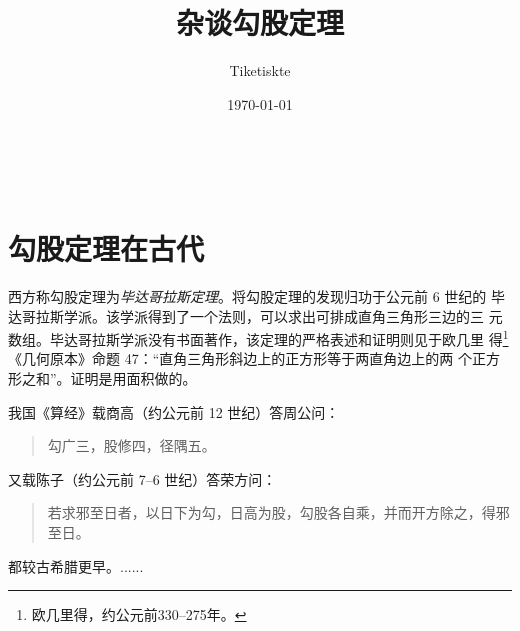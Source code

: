 \documentclass[UTF8]{ctexart} %
\title{杂谈勾股定理}
\author{Tiketiskte}
\date{\today}
\begin{document}

    \maketitle %
    \
    \tableofcontents %
    \section{勾股定理在古代} %
    西方称勾股定理为\emph{毕达哥拉斯定理}。将勾股定理的发现归功于公元前 6 世纪的
    毕达哥拉斯学派。该学派得到了一个法则，可以求出可排成直角三角形三边的三
    元数组。毕达哥拉斯学派没有书面著作，该定理的严格表述和证明则见于欧几里
    得\footnote{欧几里得，约公元前330--275年。}《几何原本》命题 47：“直角三角形斜边上的正方形等于两直角边上的两
    个正方形之和”。证明是用面积做的。

    我国《算经》载商高（约公元前 12 世纪）答周公问：
    \begin{quote}
        \kaishu
        勾广三，股修四，径隅五。
    \end{quote}
    又载陈子（约公元前 7--6 世纪）答荣方问：%
    \begin{quote}
        \kaishu
        若求邪至日者，以日下为勾，日高为股，勾股各自乘，并而开方除之，得邪至日。
    \end{quote}
    都较古希腊更早。......
\end{document}
